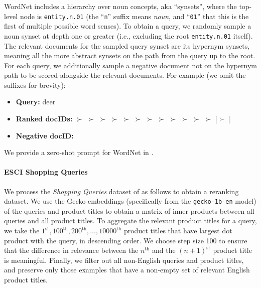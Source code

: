 \documentclass[11pt, a4paper, onecolumn, confidential, copyright, gdm]{google}
\begin{document}
WordNet \citep{fellbaum1998wordnet} includes a hierarchy over noun concepts, aka ``synsets'', where the top-level node is \texttt{entity.n.01} (the ``\texttt{n}'' suffix means \textit{noun}, and ``\texttt{01}'' that this is the first of multiple possible word senses). To obtain a query, we randomly sample a noun synset at depth one or greater (i.e., excluding the root \texttt{entity.n.01} itself). The relevant documents for the sampled query synset are its hypernym synsets, meaning all the more abstract synsets on the path from the query up to the root. For each query, we additionally sample a negative document not on the hypernym path to be scored alongside the relevant documents. For example (we omit the suffixes for brevity):
\begin{itemize}[align=left,leftmargin=*,itemsep=0pt,topsep=0pt]
    \item \textbf{Query:} deer
    \item \textbf{Ranked docIDs:}  $\succ$  $\succ$  $\succ$  $\succ$  $\succ$  $\succ$  $\succ$  $\succ$  $\succ$  $\succ$  $\succ$  $\succ$  \textcolor{gray}{[$\succ$ ]}
    \item \textbf{Negative docID:} 
\end{itemize}
\noindent We provide a zero-shot prompt for WordNet in .

\vspace{-0.6em}
\paragraph{ESCI Shopping Queries}\label{sec:esci-dataset}

We process the \textit{Shopping Queries} dataset of \cite{reddy2022shopping} as follows to obtain a reranking dataset. We use the Gecko \citep{lee2024gecko} embeddings (specifically from the \texttt{gecko-1b-en} model) of the queries and product titles to obtain a matrix of inner products between all queries and all product titles. To aggregate the relevant product titles for a query, we take the $1^\text{st}, 100^\text{th}, 200^\text{th}, \ldots, 10000^\text{th}$ product titles that have largest dot product with the query, in descending order. We choose step size 100 to ensure that the difference in relevance between the $n^\text{th}$ and the $(n+1)^\text{st}$ product title is meaningful. Finally, we filter out all non-English queries and product titles, and preserve only those examples that have a non-empty set of relevant English product titles.
\end{document}
